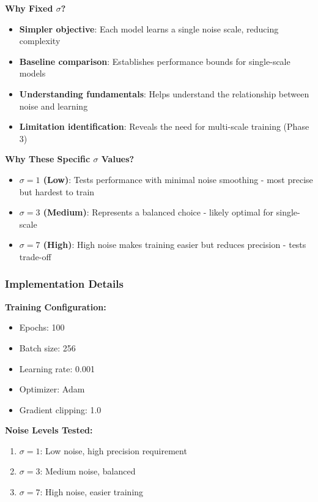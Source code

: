 \documentclass[12pt,a4paper]{article}
\begin{document}
\textbf{Why Fixed $\sigma$?}
\begin{itemize}
    \item \textbf{Simpler objective}: Each model learns a single noise scale, reducing complexity
    \item \textbf{Baseline comparison}: Establishes performance bounds for single-scale models
    \item \textbf{Understanding fundamentals}: Helps understand the relationship between noise and learning
    \item \textbf{Limitation identification}: Reveals the need for multi-scale training (Phase 3)
\end{itemize}

\textbf{Why These Specific $\sigma$ Values?}
\begin{itemize}
    \item \textbf{$\sigma = 1$ (Low)}: Tests performance with minimal noise smoothing - most precise but hardest to train
    \item \textbf{$\sigma = 3$ (Medium)}: Represents a balanced choice - likely optimal for single-scale
    \item \textbf{$\sigma = 7$ (High)}: High noise makes training easier but reduces precision - tests trade-off
\end{itemize}

\subsubsection{Implementation Details}

\textbf{Training Configuration:}
\begin{itemize}
    \item Epochs: 100
    \item Batch size: 256
    \item Learning rate: 0.001
    \item Optimizer: Adam
    \item Gradient clipping: 1.0
\end{itemize}

\textbf{Noise Levels Tested:}
\begin{enumerate}
    \item $\sigma = 1$: Low noise, high precision requirement
    \item $\sigma = 3$: Medium noise, balanced
    \item $\sigma = 7$: High noise, easier training
\end{enumerate}
\end{document}
